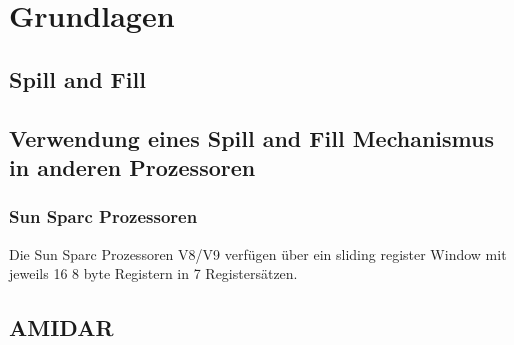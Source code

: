 \chapter{Grundlagen}
\label{cha:Grundlagen}

\section{Spill and Fill}
\section{Verwendung eines Spill and Fill Mechanismus in anderen Prozessoren}
\subsection{Sun Sparc Prozessoren}
Die Sun Sparc Prozessoren V8/V9 verfügen über ein sliding register Window mit jeweils 16 8 byte Registern in 7 Registersätzen.  
\section{AMIDAR}